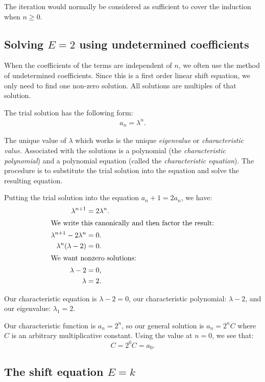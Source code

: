 \documentclass[12pt,letterpaper,reqno]{amsart}
\numberwithin{equation}{section}
\numberwithin{theorem}{section}
\numberwithin{table}{section}
\begin{document}
The iteration would normally be considered as sufficient to cover the induction when $n\geq 0$.

\subsection{Solving $E=2$ using undetermined coefficients}

When the coefficients of the terms are independent of $n$, we often use the method of undetermined coefficients.  Since this is a first order linear shift equation, we only need to find one non-zero solution.  All solutions are multiples of that solution.

The trial solution has the following form:
\begin{align}
	a_n = \lambda^n
	\text{.}
\end{align}

The unique value of $\lambda$ which works is the unique \emph{eigenvalue} or \emph{characteristic value}.  Associated with the solutions is a polynomial (the \emph{characteristic polynomial}) and a polynomial equation (called the \emph{characteristic equation}).  The procedure is to substitute the trial solution into the equation and solve the resulting equation.

Putting the trial solution into the equation $a_n+1=2a_n$, we have:
\begin{align}
	\lambda^{n+1} &= 2\lambda^n \text{.} \\
\intertext{We write this canonically and then factor the result:}
	\lambda^{n+1} - 2\lambda^n &= 0 \text{.} \\
	\lambda^n (\lambda - 2) &= 0 \text{.} \\
\intertext{We want nonzero solutions:}
	\lambda - 2 &= 0 \text{,} \\
	\lambda &= 2.
\end{align}

Our characteristic equation is $\lambda-2=0$, our characteristic polynomial: $\lambda-2$, and our eigenvalue: $\lambda_1=2$.

Our characteristic function is $a_n=2^n$, so our general solution is $a_n=2^nC$ where $C$ is an arbitrary multiplicative constant.  Using the value at $n=0$, we see that:
\[
	C = 2^0 C = a_0
	\text{.}
\]

\subsection{The shift equation $E=k$}
\end{document}
